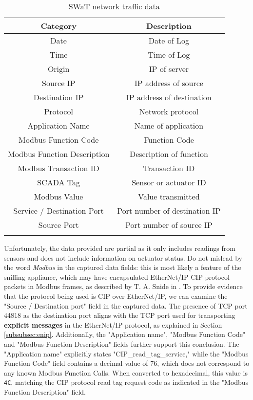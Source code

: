 {\small
\begin{longtable}[c]{| c | c |}
	\hline
	\textbf{Category} & \textbf{Description} \\ [0.5ex] 
	\hline
	Date & Date of Log \\
	\hline 
	Time & Time of Log \\
	\hline
	Origin & IP of server \\
	\hline 
	Source IP & IP address of source \\ 
	\hline
	Destination IP & IP address of destination \\ 
	\hline
	Protocol & Network protocol \\ 
	\hline
	Application Name & Name of application \\ 
	\hline
	Modbus Function Code & Function Code \\ 
	\hline
	Modbus Function Description & Description of function \\ 
	\hline
	Modbus Transaction ID & Transaction ID \\ 
	\hline
	SCADA Tag & Sensor or actuator ID \\ 
	\hline
	Modbus Value & Value transmitted \\ 
	\hline
	Service / Destination Port & Port number of destination IP \\ 
	\hline
	Source Port & Port number of source IP \\ 
	\hline
	
	\caption{SWaT network traffic data}
	\label{table:5_swat_network_traffic_data}
\end{longtable} }
Unfortunately, the data provided are partial as it only includes readings from sensors and does not include information on actuator status.\newline \newline
Do not mislead by the word \textit{Modbus} in the captured data fields: this is most likely a feature of the sniffing appliance, which may have encapsulated EtherNet/IP-CIP protocol packets in Modbus frames, as described by T. A. Snide in \cite{cip_in_modbus}.\newline
To provide evidence that the protocol being used is CIP over EtherNet/IP, we can examine the "Source / Destination port" field in the captured data. The presence of TCP port 44818 as the destination port aligns with the TCP port used for transporting \textbf{explicit messages} in the EtherNet/IP protocol, as explained in Section \ref{subsubsec:enip}. Additionally, the "Application name", "Modbus Function Code" and "Modbus Function Description" fields further support this conclusion. The "Application name" explicitly states "CIP\_read\_tag\_service," while the "Modbus Function Code" field contains a decimal value of 76, which does not correspond to any known Modbus Function Calls. When converted to hexadecimal, this value is \texttt{4C}, matching the CIP protocol read tag request code as indicated in the "Modbus Function Description" field.

